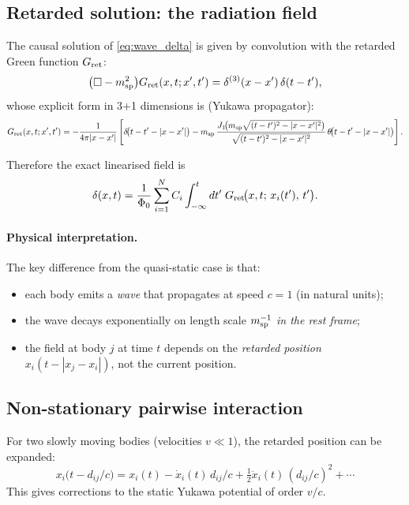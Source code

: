 \subsection{Retarded solution: the radiation field}

The causal solution of \eqref{eq:wave_delta} is given by convolution with
the retarded Green function $G_{\rm ret}$:
\begin{equation}
\bigl(\Box - m_{\rm sp}^2\bigr)G_{\rm ret}(x,t;x',t')
= \delta^{(3)}(x-x')\,\delta(t-t'),
\end{equation}
whose explicit form in 3+1 dimensions is (Yukawa propagator):
\begin{equation}
G_{\rm ret}(x,t;x',t')
=
-\frac{1}{4\pi |x-x'|}
\left[
  \delta\!\bigl(t-t'-|x-x'|\bigr)
  - m_{\rm sp}\,\frac{J_1\!\bigl(m_{\rm sp}\sqrt{(t-t')^2-|x-x'|^2}\bigr)}
                     {\sqrt{(t-t')^2-|x-x'|^2}}\,
    \theta\!\bigl(t-t'-|x-x'|\bigr)
\right].
\end{equation}

Therefore the exact linearised field is
\begin{equation}
\delta(x,t)
=
\frac{1}{\Phi_0}
\sum_{i=1}^N C_i
\int_{-\infty}^{t} dt'\;
G_{\rm ret}\!\bigl(x,t;\, x_i(t'),\, t'\bigr).
\end{equation}

\paragraph{Physical interpretation.}
The key difference from the quasi-static case is that:
\begin{itemize}
  \item each body emits a \emph{wave} that propagates at speed $c=1$
    (in natural units);
  \item the wave decays exponentially on length scale $m_{\rm sp}^{-1}$
    \emph{in the rest frame};
  \item the field at body $j$ at time $t$ depends on the \emph{retarded
    position} $x_i(t - |x_j - x_i|)$, not the current position.
\end{itemize}

\subsection{Non-stationary pairwise interaction}

For two slowly moving bodies (velocities $v \ll 1$), the retarded position
can be expanded:
\begin{equation}
x_i\!\bigl(t - d_{ij}/c\bigr)
= x_i(t) - \dot x_i(t)\,d_{ij}/c + \tfrac{1}{2}\ddot x_i(t)\,(d_{ij}/c)^2 + \cdots
\end{equation}
This gives corrections to the static Yukawa potential of order $v/c$.

